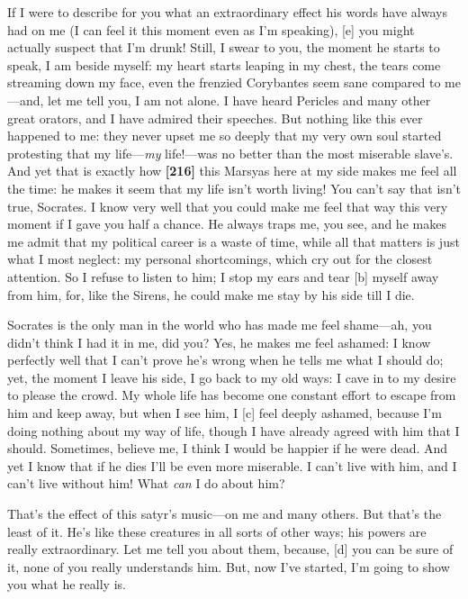 If I were to describe for you what an extraordinary effect his words
have always had on me (I can feel it this moment even as I'm speaking),
{[}e{]} you might actually suspect that I'm drunk! Still, I swear to
you, the moment he starts to speak, I am beside myself: my heart starts
leaping in my chest, the tears come streaming down my face, even the
frenzied Corybantes
seem sane compared to me---and, let me tell you, I am not alone. I have
heard Pericles and many other great orators, and I have admired their
speeches. But nothing like this ever happened to me: they never upset me
so deeply that my very own soul started protesting that my
life---{\em my} life!---was no better than the most miserable slave's.
And yet that is exactly how {\bf {[}216{]}} this Marsyas here at my side
makes me feel all the time: he makes it seem that my life isn't worth
living! You can't say that isn't true, Socrates. I know very well that
you could make me feel that way this very moment if I gave you half a
chance. He always traps me, you see, and he makes me admit that my
political career is a waste of time, while all that matters is just what
I most neglect: my personal shortcomings, which cry out for the closest
attention. So I refuse to listen to him; I stop my ears and tear {[}b{]}
myself away from him, for, like the Sirens, he could make me stay by his
side till I die.

Socrates is the only man in the world who has made me feel shame---ah,
you didn't think I had it in me, did you? Yes, he makes me feel ashamed:
I know perfectly well that I can't prove he's wrong when he tells me
what I should do; yet, the moment I leave his side, I go back to my old
ways: I cave in to my desire to please the crowd. My whole life has
become one constant effort to escape from him and keep away, but when I
see him, I {[}c{]} feel deeply ashamed, because I'm doing nothing about
my way of life, though I have already agreed with him that I should.
Sometimes, believe me, I think I would be happier if he were dead. And
yet I know that if he dies I'll be even more miserable. I can't live
with him, and I can't live without him! What {\em can} I do about him?

That's the effect of this satyr's music---on me and many others. But
that's the least of it. He's like these creatures in all sorts of other
ways; his powers are really extraordinary. Let me tell you about them,
because, {[}d{]} you can be sure of it, none of you really understands
him. But, now I've started, I'm going to show you what he really is.

